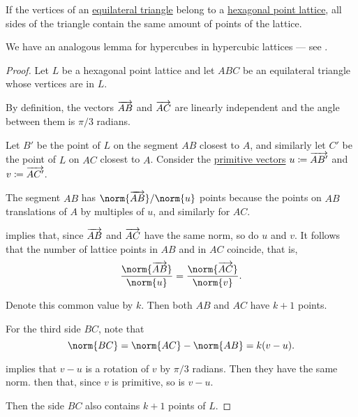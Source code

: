 \begin{lemma}\label{thm:hexagonal_point_lattice_equilateral_triangle}
  If the vertices of an \hyperref[def:triangle/equilateral]{equilateral triangle} belong to a \hyperref[def:hexagonal_point_lattice]{hexagonal point lattice}, all sides of the triangle contain the same amount of points of the lattice.
\end{lemma}
\begin{comments}
  \item We have an analogous lemma for hypercubes in hypercubic lattices --- see .
\end{comments}
\begin{proof}
  Let \( L \) be a hexagonal point lattice and let \( ABC \) be an equilateral triangle whose vertices are in \( L \).

  By definition, the vectors \( \overrightarrow{AB} \) and \( \overrightarrow{AC} \) are linearly independent and the angle between them is \( \pi / 3 \) radians.

  Let \( B' \) be the point of \( L \) on the segment \( AB \) closest to \( A \), and similarly let \( C' \) be the point of \( L \) on \( AC \) closest to \( A \). Consider the \hyperref[def:primitive_lattice_vector]{primitive vectors} \( u \coloneqq \overrightarrow{AB'} \) and \( v \coloneqq \overrightarrow{AC'} \).

  The segment \( AB \) has \( \norm{\vect{AB}} / \norm{u} \) points because the points on \( AB \) translations of \( A \) by multiples of \( u \), and similarly for \( AC \).

   implies that, since \( \overrightarrow{AB} \) and \( \overrightarrow{AC} \) have the same norm, so do \( u \) and \( v \). It follows that the number of lattice points in \( AB \) and in \( AC \) coincide, that is,
  \begin{equation*}
    \frac {\norm{\vect{AB}}} {\norm{u}} = \frac {\norm{\vect{AC}}} {\norm{v}}.
  \end{equation*}

  Denote this common value by \( k \). Then both \( AB \) and \( AC \) have \( k + 1 \) points.

  For the third side \( BC \), note that
  \begin{equation*}
    \norm{BC} = \norm{AC} - \norm{AB} = k(v - u).
  \end{equation*}

   implies that \( v - u \) is a rotation of \( v \) by \( \pi / 3 \) radians. Then they have the same norm.  then that, since \( v \) is primitive, so is \( v - u \).

  Then the side \( BC \) also contains \( k + 1 \) points of \( L \).
\end{proof}

